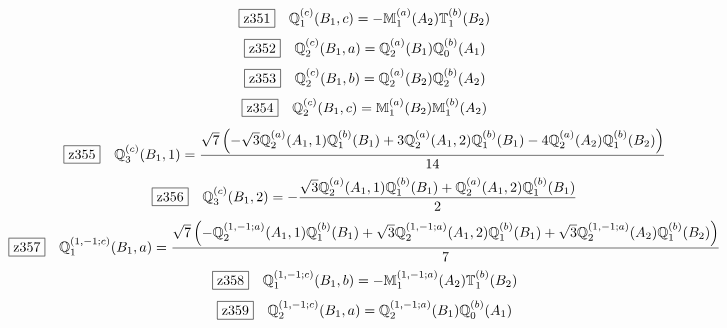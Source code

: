 \documentclass[fleqn,10pt,landscape]{jsarticle}
\begin{document}
\begin{dmath*}
\hspace*{3mm}\fbox{z351}\quad \mathbb{Q}_{1}^{(c)}(B_{1},c)=- \mathbb{M}_{1}^{(a)}(A_{2}) \mathbb{T}_{1}^{(b)}(B_{2})
\end{dmath*}
\begin{dmath*}
\hspace*{3mm}\fbox{z352}\quad \mathbb{Q}_{2}^{(c)}(B_{1},a)=\mathbb{Q}_{2}^{(a)}(B_{1}) \mathbb{Q}_{0}^{(b)}(A_{1})
\end{dmath*}
\begin{dmath*}
\hspace*{3mm}\fbox{z353}\quad \mathbb{Q}_{2}^{(c)}(B_{1},b)=\mathbb{Q}_{2}^{(a)}(B_{2}) \mathbb{Q}_{2}^{(b)}(A_{2})
\end{dmath*}
\begin{dmath*}
\hspace*{3mm}\fbox{z354}\quad \mathbb{Q}_{2}^{(c)}(B_{1},c)=\mathbb{M}_{1}^{(a)}(B_{2}) \mathbb{M}_{1}^{(b)}(A_{2})
\end{dmath*}
\begin{dmath*}
\hspace*{3mm}\fbox{z355}\quad \mathbb{Q}_{3}^{(c)}(B_{1},1)=\frac{\sqrt{7} \left(- \sqrt{3} \mathbb{Q}_{2}^{(a)}(A_{1},1) \mathbb{Q}_{1}^{(b)}(B_{1}) + 3 \mathbb{Q}_{2}^{(a)}(A_{1},2) \mathbb{Q}_{1}^{(b)}(B_{1}) - 4 \mathbb{Q}_{2}^{(a)}(A_{2}) \mathbb{Q}_{1}^{(b)}(B_{2})\right)}{14}
\end{dmath*}
\begin{dmath*}
\hspace*{3mm}\fbox{z356}\quad \mathbb{Q}_{3}^{(c)}(B_{1},2)=- \frac{\sqrt{3} \mathbb{Q}_{2}^{(a)}(A_{1},1) \mathbb{Q}_{1}^{(b)}(B_{1}) + \mathbb{Q}_{2}^{(a)}(A_{1},2) \mathbb{Q}_{1}^{(b)}(B_{1})}{2}
\end{dmath*}
\begin{dmath*}
\hspace*{3mm}\fbox{z357}\quad \mathbb{Q}_{1}^{(1,-1;c)}(B_{1},a)=\frac{\sqrt{7} \left(- \mathbb{Q}_{2}^{(1,-1;a)}(A_{1},1) \mathbb{Q}_{1}^{(b)}(B_{1}) + \sqrt{3} \mathbb{Q}_{2}^{(1,-1;a)}(A_{1},2) \mathbb{Q}_{1}^{(b)}(B_{1}) + \sqrt{3} \mathbb{Q}_{2}^{(1,-1;a)}(A_{2}) \mathbb{Q}_{1}^{(b)}(B_{2})\right)}{7}
\end{dmath*}
\begin{dmath*}
\hspace*{3mm}\fbox{z358}\quad \mathbb{Q}_{1}^{(1,-1;c)}(B_{1},b)=- \mathbb{M}_{1}^{(1,-1;a)}(A_{2}) \mathbb{T}_{1}^{(b)}(B_{2})
\end{dmath*}
\begin{dmath*}
\hspace*{3mm}\fbox{z359}\quad \mathbb{Q}_{2}^{(1,-1;c)}(B_{1},a)=\mathbb{Q}_{2}^{(1,-1;a)}(B_{1}) \mathbb{Q}_{0}^{(b)}(A_{1})
\end{dmath*}
\end{document}
